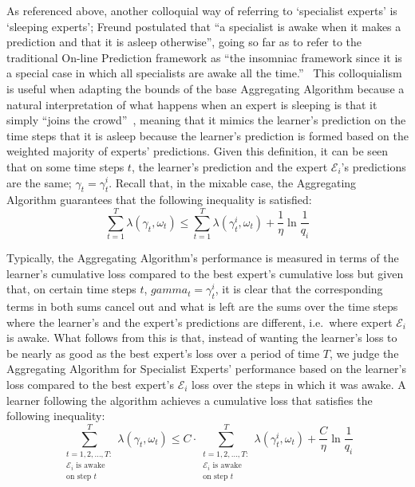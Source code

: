 As referenced above, another colloquial way of referring to `specialist experts' is `sleeping experts'; Freund postulated that ``a specialist is awake when it makes a prediction and that it is asleep otherwise'', going so far as to refer to the traditional On-line Prediction framework as ``the insomniac framework since it is a special case in which all specialists are awake all the time.''~\cite{freund:1997} This colloquialism is useful when adapting the bounds of the base Aggregating Algorithm because a natural interpretation of what happens when an expert is sleeping is that it simply ``joins the crowd''~\cite{kalnishkan:2022}, meaning that it mimics the learner's prediction on the time steps that it is asleep because the learner's prediction is formed based on the weighted majority of experts' predictions. Given this definition, it can be seen that on some time steps $t$, the learner's prediction and the expert $\mathcal{E}_i$'s predictions are the same; $\gamma_t = \gamma_t^i$.
Recall that, in the mixable case, the Aggregating Algorithm guarantees that the following inequality is satisfied:
\begin{equation*}
    \overset{T}{\underset{t=1}{\sum}}\lambda(\gamma_t, \omega_t) \leq \overset{T}{\underset{t=1}{\sum}}\lambda(\gamma_t^i, \omega_t) + \frac{1}{\eta} \ln \frac{1}{q_i}
\end{equation*}

Typically, the Aggregating Algorithm's performance is measured in terms of the learner's cumulative loss compared to the best expert's cumulative loss but given that, on certain time steps $t$, $gamma_t = \gamma_t^i$, it is clear that the corresponding terms in both sums cancel out and what is left are the sums over the time steps where the learner's and the expert's predictions are different, i.e.\ where expert $\mathcal{E}_i$ is awake. What follows from this is that, instead of wanting the learner's loss to be nearly as good as the best expert's loss over a period of time $T$, we judge the Aggregating Algorithm for Specialist Experts' performance based on the learner's loss compared to the best expert's $\mathcal{E}_i$ loss over the steps in which it was awake. A learner following the algorithm achieves a cumulative loss that satisfies the following inequality:
\begin{equation}
    \overset{T}{\underset{\substack{t=1,2,\ldots,T:\\\mathcal{E}_i\text{ is awake}\\\text{on step }t}}{\sum}}\lambda(\gamma_t, \omega_t) \leq C \cdot \overset{T}{\underset{\substack{t=1,2,\ldots,T:\\\mathcal{E}_i\text{ is awake}\\\text{on step }t}}{\sum}} \lambda(\gamma^i_t, \omega_t) + \frac{C}{\eta}\ln\frac{1}{q_i}
\end{equation}

